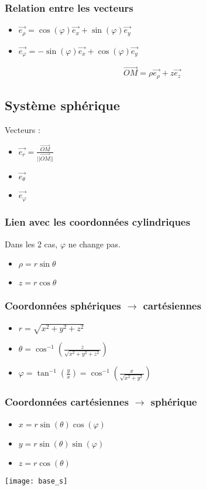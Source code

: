 \documentclass[french]{yLectureNote}
\renewcommand{\vec}{\overrightarrow}
\begin{document}
\subsubsection{Relation entre les vecteurs}
\begin{itemize}
 \item $\vec{e_{\rho}} = \cos( \varphi) \vec{e_x}+\sin( \varphi) \vec{e_y}$
 \item $\vec{e_{\varphi}} = -\sin( \varphi) \vec{e_x}+\cos( \varphi) \vec{e_y}$
\end{itemize}
\begin{theorem}
 \[\vec{OM} = \rho \vec{e_{\rho}} + z\vec{e_z}\]
\end{theorem}
\subsection{Système sphérique}

\begin{multicols}{2}
Vecteurs :
\begin{itemize}
 \item $\vec{e_{r}} = \frac{\vec{OM}}{||\vec{OM}||}$
 \item $\vec{e_{\theta}}$
 \item $ \vec{e_{\varphi}}$
\end{itemize}
\subsubsection{Lien avec les coordonnées cylindriques}
Dans les 2 cas, $\varphi$ ne change pas.
\begin{itemize}
 \item $\rho = r\sin\theta$
 \item $z = r\cos\theta$
\end{itemize}
\subsubsection{Coordonnées sphériques $\to$ cartésiennes}
\begin{itemize}
 \item $r = \sqrt{x^2+y^2+z^2}$
 \item $\theta = \cos^{-1}(\frac{z}{\sqrt{x^2+y^2+z^2}})$
 \item $\varphi = \tan^{-1}(\frac{y}{x}) = \cos^{-1}(\frac{x}{\sqrt{x^2+y^2}})$
\end{itemize}
\subsubsection{Coordonnées cartésiennes $\to$ sphérique}
\begin{itemize}
 \item $x = r\sin(\theta) \cos(\varphi)$
 \item $ y =  r\sin(\theta) \sin(\varphi)$
 \item $z = r\cos(\theta)$
\end{itemize}
\texttt{[image: base\_s]}
\end{multicols}
\end{document}
